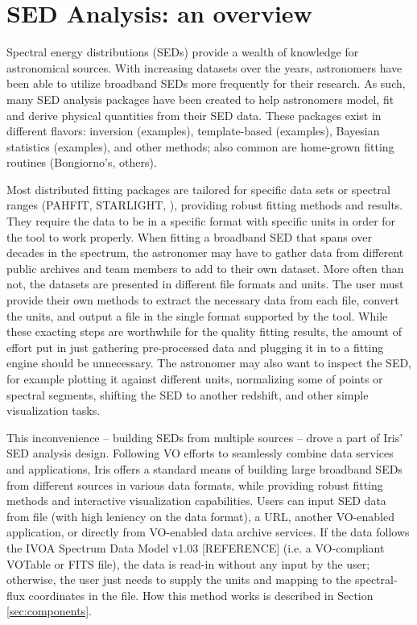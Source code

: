 \label{everyday_seds}
\section{SED Analysis: an overview}

Spectral energy distributions (SEDs) provide a wealth of knowledge for astronomical sources. With increasing datasets over the years, astronomers have been able to utilize broadband SEDs more frequently for their research. As such, many SED analysis packages have been created to help astronomers model, fit and derive physical quantities from their SED data. These packages exist in different flavors: inversion (examples), template-based (examples), Bayesian statistics (examples), and other methods; also common are home-grown fitting routines (Bongiorno's, others). 

Most distributed fitting packages are tailored for specific data sets or spectral ranges (PAHFIT, STARLIGHT, ), providing robust fitting methods and results. They require the data to be in a specific format with specific units in order for the tool to work properly. When fitting a broadband SED that spans over decades in the spectrum, the astronomer may have to gather data from different public archives and team members to add to their own dataset. More often than not, the datasets are presented in different file formats and units. The user must provide their own methods to extract the necessary data from each file, convert the units, and output a file in the single format supported by the tool. While these exacting steps are worthwhile for the quality fitting results, the amount of effort put in just gathering pre-processed data and plugging it in to a fitting engine should be unnecessary. The astronomer may also want to inspect the SED, for example plotting it against different units, normalizing some of points or spectral segments, shifting the SED to another redshift, and other simple visualization tasks.

This inconvenience -- building SEDs from multiple sources -- drove a part of Iris' SED analysis design. Following VO efforts to seamlessly combine data services and applications, Iris offers a standard means of building large broadband SEDs from different sources in various data formats, while providing robust fitting methods and interactive visualization capabilities. Users can input SED data from file (with high leniency on the data format), a URL, another VO-enabled application, or directly from VO-enabled data archive services. If the data follows the IVOA Spectrum Data Model v1.03 [REFERENCE] (i.e. a VO-compliant VOTable or FITS file), the data is read-in without any input by the user; otherwise, the user just needs to supply the units and  mapping to the spectral-flux coordinates in the file. How this method works is described in Section \ref{sec:components}. 

